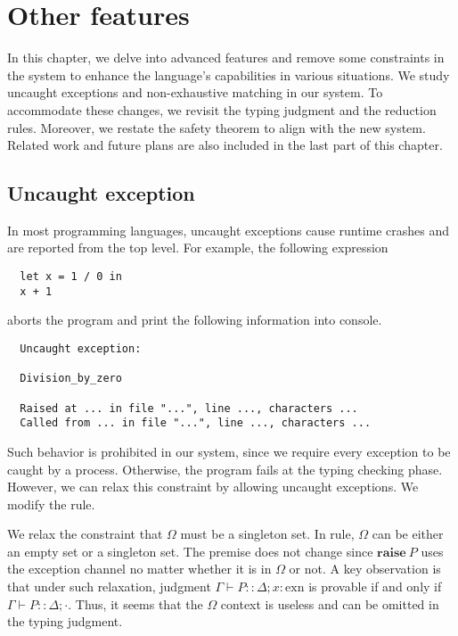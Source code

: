 \documentclass[12pt, openany]{memoir}
\newcommand*{\craise}[1]{\textbf{raise}\ #1}
\newcommand*{\judge}[4]{#1 \vdash #2 :: #3; #4}
\begin{document}
\chapter{Other features}
In this chapter, we delve into advanced features and remove some constraints in the system to enhance the language's 
capabilities in various situations. We study uncaught exceptions and non-exhaustive matching in our system. 
To accommodate these changes, we revisit the typing judgment and the reduction rules. Moreover, we restate the safety theorem to align with the new system. 
Related work and future plans are also included in the last part of this chapter.
\section{Uncaught exception} \label{sec:uncaught}
In most programming languages, uncaught exceptions cause runtime crashes and are reported from the top level. For example, 
the following expression
\begin{verbatim}
  let x = 1 / 0 in
  x + 1  
\end{verbatim}
aborts the program and print the following information into console.
\begin{verbatim}
  Uncaught exception:                   
    
  Division_by_zero

  Raised at ... in file "...", line ..., characters ...
  Called from ... in file "...", line ..., characters ...
\end{verbatim}
Such behavior is prohibited in our system, since we require every exception to be caught by a process.
Otherwise, the program fails at the typing checking phase. However, we can relax this constraint by allowing uncaught exceptions.
We modify the  rule.
\begin{rules}
  \defrule[raise'][raise']{
    \judge{\Gamma}{P}{\Delta}{\cdot}
  }{\judge{\Gamma}{\craise{P}}{\Delta}{\Omega}}
\end{rules}
We relax the constraint that $\Omega$ must be a singleton set. In  rule, $\Omega$ can be either an empty set or a singleton set.
The premise does not change since $\craise{P}$ uses the exception channel no matter whether it is in $\Omega$ or not.
A key observation is that under such relaxation, judgment $\judge{\Gamma}{P}{\Delta}{x : \text{exn}}$ is provable if and only if
$\judge{\Gamma}{P}{\Delta}{\cdot}$. Thus, it seems that the $\Omega$ context is useless and can be omitted in the typing judgment.
\end{document}
